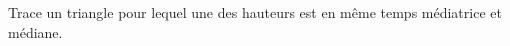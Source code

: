
\begin{exercice}\label{exosmath-0919}

    Trace un triangle pour lequel une des hauteurs est en même temps médiatrice et médiane.

\end{exercice}
